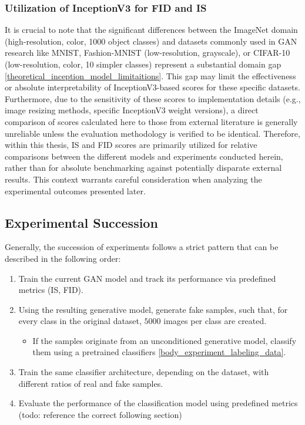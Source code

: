 \subsubsection{Utilization of InceptionV3 for FID and IS}\label{body_experiment_inception_model}
It is crucial to note that the significant differences between the ImageNet domain (high-resolution, color, 1000 object classes) and datasets commonly used in GAN research like MNIST, Fashion-MNIST (low-resolution, grayscale), or CIFAR-10 (low-resolution, color, 10 simpler classes) represent a substantial domain gap \ref{theoretical_inception_model_limitaitions}. This gap may limit the effectiveness or absolute interpretability of InceptionV3-based scores for these specific datasets. Furthermore, due to the sensitivity of these scores to implementation details (e.g., image resizing methods, specific InceptionV3 weight versions), a direct comparison of scores calculated here to those from external literature is generally unreliable unless the evaluation methodology is verified to be identical. Therefore, within this thesis, IS and FID scores are primarily utilized for relative comparisons between the different models and experiments conducted herein, rather than for absolute benchmarking against potentially disparate external results. This context warrants careful consideration when analyzing the experimental outcomes presented later.


\subsection{Experimental Succession}\label{body_experiment_succession}
Generally, the succession of experiments follows a strict pattern that can be described in the following order:
\begin{enumerate}
    \item Train the current GAN model and track its performance via predefined metrics (IS, FID).
    \item Using the resulting generative model, generate fake samples, such that, for every class in the original dataset, \(5000\) images per class are created.
    \begin{itemize}
        \item If the samples originate from an unconditioned generative model, classify them using a pretrained classifiers \ref{body_experiment_labeling_data}.
    \end{itemize}
    \item Train the same classifier architecture, depending on the dataset, with different ratios of real and fake samples.
    \item Evaluate the performance of the classification model using predefined metrics (todo: reference the correct following section)
\end{enumerate}

